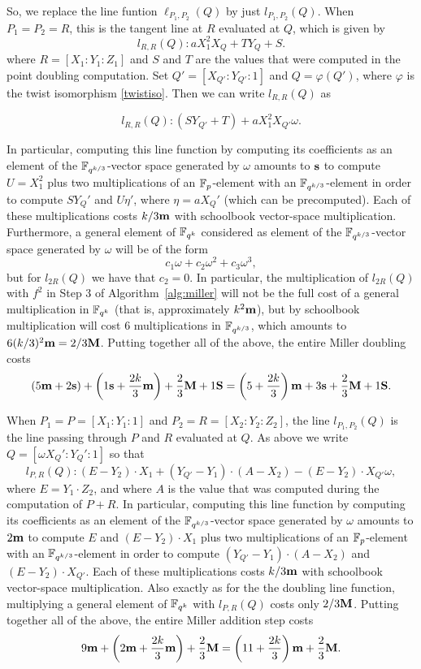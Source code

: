 So, we replace the line funtion $\ell_{P_1,P_2}(Q)$ by just $l_{P_1,P_2}(Q)$.
When $P_1 = P_2 = R$, this is the tangent line at $R$ evaluated at $Q$, which is given by
\[l_{R,R}(Q): aX_1^2 X_Q + T Y_Q + S.\]
where $R = [X_1:Y_1:Z_1]$ 
and $S$ and $T$ are the values that were computed in the point doubling computation.
Set $Q' = [X_{Q'}:Y_{Q'}:1]$ and $Q = \varphi(Q')$, where
$\varphi$ is the twist isomorphism \eqref{twistiso}.
Then we can write $l_{R,R}(Q)$ as

\[l_{R,R}(Q): (S Y_{Q'} + T) + aX_1^2 X_{Q'} \omega.\]

In particular, computing this line function by computing its coefficients as an element of the $\mathbb{F}_{q^{k/3}}$-vector space
generated by $\omega$ amounts to $\textbf{s}$ to compute $U = X_1^2$ plus two multiplications of an $\mathbb{F}_{p}$-element
with an $\mathbb{F}_{q^{k/3}}$-element in order to compute $S Y_Q'$ and $U \eta'$, 
where $\eta = aX_Q'$ (which can be precomputed). 
Each of these multiplications
costs $k/3\textbf{m}$ with schoolbook vector-space multiplication.
Furthermore, a general element of $\mathbb{F}_{q^k}$ considered as element of the $\mathbb{F}_{q^{k/3}}$-vector space generated
by $\omega$ will be of the form 
\[c_1 \omega + c_2 \omega^2 + c_3 \omega^3,\]
but for $l_{2R}(Q)$ we have that $c_2 = 0$. In particular, the multiplication of $l_{2R}(Q)$ with $f^2$ in
Step 3 of Algorithm~\ref{alg:miller} will not be the full cost of a general multiplication in $\mathbb{F}_{q^k}$ (that
is, approximately $k^2\textbf{m}$), but by schoolbook multiplication will cost 6 multiplications in $\mathbb{F}_{q^{k/3}}$, which
amounts to $6 (k/3)^2 \textbf{m} = 2/3 \textbf{M}$.
Putting together all of the above, the entire Miller doubling costs
\[(5\textbf{m} + 2\textbf{s}) + \left(1\textbf{s} + \frac{2k}{3}\textbf{m}\right) + \frac{2}{3}\textbf{M}  + 1\textbf{S} 
= \left( 5 + \frac{2k}{3}\right)\textbf{m} + 3\textbf{s} + \frac{2}{3}\textbf{M} + 1\textbf{S}.\]

When $P_1  = P = [X_1:Y_1:1]$ and $P_2 = R = [X_2:Y_2:Z_2]$, 
the line $l_{P_1,P_2}(Q)$ is the line passing through $P$ and $R$ evaluated at $Q$.
As above we write $Q = [\omega X_Q':Y_Q':1]$ so that
$$l_{P,R}(Q): (E - Y_2) \cdot X_1 + (Y_{Q'} - Y_1) \cdot (A - X_2) - (E - Y_2) \cdot X_{Q'}\omega,  $$
where $E = Y_1 \cdot Z_2$, and where $A$ is the value that was computed during the computation of $P+R$.
In particular, computing this line function by computing its coefficients as an element of the $\mathbb{F}_{q^{k/3}}$-vector space
generated by $\omega$ amounts to $2\textbf{m}$ to compute $E$ and $(E-Y_2)\cdot X_1$ plus 
two multiplications of an $\mathbb{F}_{p}$-element with an $\mathbb{F}_{q^{k/3}}$-element in order to compute 
$(Y_{Q'} - Y_1) \cdot (A - X_2)$ and $(E - Y_2) \cdot X_{Q'}$. Each of these multiplications costs $k/3\textbf{m}$
with schoolbook vector-space multiplication.
Also exactly as for the the doubling line function, multiplying a general element of $\mathbb{F}_{q^k}$ with $l_{P,R}(Q)$ costs only
$2/3\textbf{M}$.
Putting together all of the above, the entire Miller addition step costs
\[9\textbf{m} + \left(2\textbf{m} + \frac{2k}{3}\textbf{m}\right) + \frac{2}{3}\textbf{M} 
= \left(11 + \frac{2k}{3}\right)\textbf{m} + \frac{2}{3}\textbf{M}.\]

